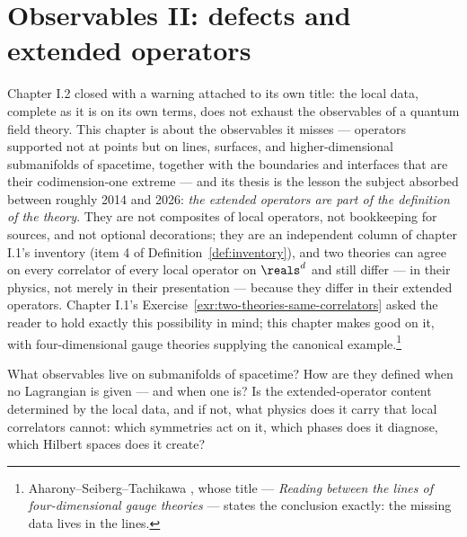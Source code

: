 \section{Observables II: defects and extended operators}
\label{ch:extended-operators}

Chapter I.2 closed with a warning attached to its own title: the local data,
complete as it is on its own terms, does not exhaust the observables of a
quantum field theory. This chapter is about the observables it misses ---
operators supported not at points but on lines, surfaces, and
higher-dimensional submanifolds of spacetime, together with the boundaries
and interfaces that are their codimension-one extreme --- and its thesis is
the lesson the subject absorbed between roughly 2014 and 2026: \emph{the
extended operators are part of the definition of the theory}. They are not
composites of local operators, not bookkeeping for sources, and not
optional decorations; they are an independent column of chapter I.1's
inventory (item 4 of Definition~\ref{def:inventory}), and two theories can
agree on every correlator of every local operator on $\reals^d$ and still
differ --- in their physics, not merely in their presentation --- because
they differ in their extended operators. Chapter I.1's
Exercise~\ref{exr:two-theories-same-correlators} asked the reader to hold
exactly this possibility in mind; this chapter makes good on it, with
four-dimensional gauge theories supplying the canonical
example.\footnote{Aharony--Seiberg--Tachikawa , whose title
--- \emph{Reading between the lines of four-dimensional gauge theories} ---
states the conclusion exactly: the missing data lives in the lines.}

\begin{qquestion}
What observables live on submanifolds of spacetime? How are they defined
when no Lagrangian is given --- and when one is? Is the extended-operator
content determined by the local data, and if not, what physics does it
carry that local correlators cannot: which symmetries act on it, which
phases does it diagnose, which Hilbert spaces does it create?
\end{qquestion}

